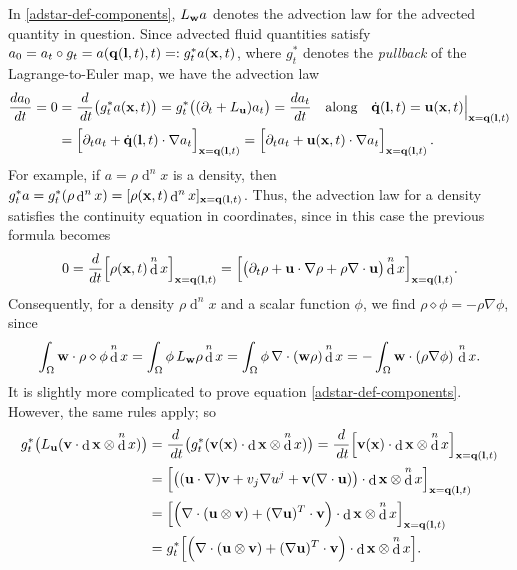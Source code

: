 \documentclass[12pt,onesided]{article}
\def\q{{\bf{q}}}
\def\l{{\bf{l}}}
\def\u{{\bf{u}}}
\def\v{{\bf{v}}}
\def\w{{\bf{w}}}
\DeclareMathOperator{\diff}{d}
\newcommand{\difft}{d}
\begin{document}
In \eqref{adstar-def-components}, $L_\w a$ denotes the advection
law for the advected quantity in question. Since advected fluid quantities satisfy $a_0=a_t\circ g_t = a(\q(\l,t),t) =:g^*_t a({\bf x}, t)$, where $g^*_t$ denotes the \emph{pullback} of the Lagrange-to-Euler map, we have the advection law
\begin{align}
\begin{split}
\frac{\difft a_0}{\difft t} = 0 & = \frac{\difft }{{\,\difft t}}\big(g^*_t a({\bf x}, t)\big) 
= g^*_t \big((\partial_t   + L_\u ) a_t \big)
= \frac{\difft a_t }{\difft t}
\quad\hbox{along}\quad  \dot \q(\l,t) = \u({\bf x},t)\Big|_{{\bf x}=\q(\l,t)}
\\&= \Big[\partial_t a_t 
+ \dot \q(\l,t)  \cdot  \nabla a_t\Big]_{{\bf x}=\q(\l,t)}  
= \Big[\partial_t a_t + \u({\bf x},t) \cdot  \nabla a_t\Big]_{{\bf x}=\q(\l,t)}
\,.
\end{split}
\label{advect-law}
\end{align}
For example, if $a=\rho \diff^nx$ is a density, then $g^*_t a= g^*_t (\rho \diff^nx) = [\rho({\bf x},t)\diff^nx]_{{\bf x}=\q(\l,t)}$. Thus, the advection law for a density satisfies the continuity equation in coordinates, since in this case the previous formula becomes 
\begin{equation}
0 
= \frac{\difft  }{\difft t} \Big[\rho({\bf x},t)\diff^nx\Big]_{{\bf x}=\q(\l,t)}
= \Big[\big(\partial_t \rho + \u\cdot\nabla\rho 
+ \rho \nabla\cdot\u\big)\diff^nx\Big]_{{\bf x}=\q(\l,t)}.
\end{equation}
Consequently, for a density $\rho \diff^nx$ and a scalar function $\phi$, we find $\rho \diamond \phi = -\rho \nabla \phi $, since
\begin{equation}
  \int_\Omega \w \cdot \rho \diamond \phi \diff^n x 
  = \int_\Omega \phi \,  L_\w \rho \diff^n x
  = \int_\Omega \phi \,  \nabla\cdot(\w \rho) \diff^n x  
  = - \int_\Omega  \w \cdot (\rho \nabla \phi) \, \diff^n x  
  .
\end{equation}
%
It is slightly more complicated to prove equation \eqref{adstar-def-components}. However, the same rules apply; so
\begin{align}
\begin{split}
g^*_t\big(L_{\u}(\v\cdot \diff {\bf x} \otimes \diff^nx)\big)
&=
\frac{\difft }{{\,\difft t}}\big(g^*_t (\v({\bf x})\cdot \diff {\bf x} \otimes \diff^nx)\big) 
=
\frac{\difft }{{\,\difft t}}\Big[\v({\bf x})\cdot \diff {\bf x} \otimes \diff^nx\Big]_{{\bf x}=\q(\l,t)}
\\& =
\Big[
\big((\u\cdot\nabla) \v + v_j \nabla u^j + \v (\nabla\cdot \u)\big)
\cdot \diff {\bf x} \otimes \diff^nx\Big]_{{\bf x}=\q(\l,t)}
\\&=
\Big[
\Big(\nabla\cdot(\u\otimes \v) + (\nabla \u)^T\cdot \v \Big)
\cdot \diff {\bf x} \otimes \diff^nx\Big]_{{\bf x}=\q(\l,t)}
\\&=
g_t^*\Big[
\Big(\nabla\cdot(\u\otimes \v) + (\nabla \u)^T\cdot \v \Big)
\cdot \diff {\bf x} \otimes \diff^nx\Big]
.
\end{split}
\end{align}
\end{document}
